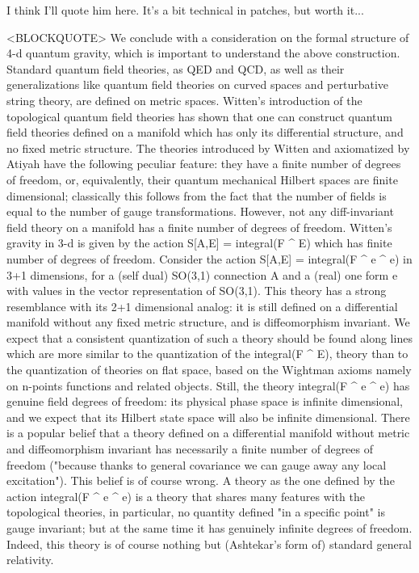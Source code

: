 I think I'll quote him here.  It's a bit technical in patches, but worth
it... 


<BLOCKQUOTE>
We conclude with a consideration on the formal structure of 4-d quantum
gravity, which is important to understand the above construction.  Standard
quantum field theories, as QED and QCD, as well as their generalizations like
quantum field theories on curved spaces and perturbative string theory, are
defined on metric spaces.  Witten's introduction of the topological quantum
field theories has shown that one can construct quantum field theories
defined on a manifold which has only its differential structure, and no fixed
metric structure. The theories introduced by Witten and axiomatized by
Atiyah have the following peculiar feature: they have a finite number of
degrees of freedom, or, equivalently, their quantum mechanical Hilbert
spaces are finite dimensional; classically this follows from the fact that
the number of fields is equal to the number of gauge transformations. However,
not any diff-invariant field theory on a manifold has a finite number of
degrees of freedom.  Witten's gravity in 3-d is given by the action 
                S[A,E] = integral(F ^ E)
which has finite number of degrees of freedom. Consider the action
              S[A,E] =  integral(F ^ e ^ e)
in 3+1 dimensions, for a (self dual) SO(3,1) connection A and a (real)
one form e with values in the vector representation of
SO(3,1). This theory has a strong resemblance with its 2+1 dimensional
analog: it is still defined on a differential manifold without any fixed
metric structure, and is diffeomorphism invariant.  We expect that a
consistent quantization of such a theory should be found along lines
which are more similar to the quantization of the integral(F ^ E),
theory than to the quantization of theories on flat space, based on the
Wightman axioms namely on n-points functions and related objects.
Still, the theory integral(F ^ e ^ e) has genuine field
degrees of freedom: its physical phase space is infinite dimensional, and we
expect that its Hilbert state space will also be infinite dimensional.  There
is a popular belief that a theory defined on a differential manifold
without metric and diffeomorphism invariant has necessarily a finite
number of degrees of freedom ("because thanks to general covariance
we can gauge away any local excitation"). This belief is of course wrong.  A
theory as the one defined by the action integral(F ^ e ^ e) 
is a theory that shares many features with the topological theories, in
particular, no quantity defined "in a specific point" is gauge
invariant; but at the same time it has genuinely infinite degrees of
freedom.  Indeed, this theory is of course nothing but (Ashtekar's
form of) standard general relativity.

